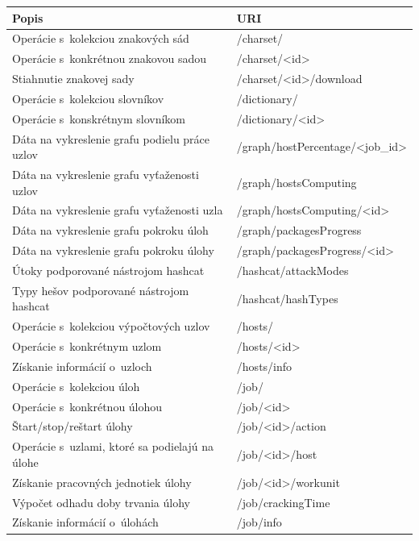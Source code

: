 \documentclass[zadani,slovak]{fitthesis}
\begin{document}
\begin{table}[h]
  \begin{center}
        \begin{tabular}{ |p{8cm}|p{7.4cm}|  }
         \hline
         Popis& URI\\
         \hline
          Operácie s~kolekciou znakových sád & /charset/ \\
          Operácie s~konkrétnou znakovou sadou & /charset/<id> \\
          Stiahnutie znakovej sady & /charset/<id>/download \\
          Operácie s~kolekciou slovníkov & /dictionary/ \\
          Operácie s~konskrétnym slovníkom & /dictionary/<id> \\
          Dáta na vykreslenie grafu podielu práce uzlov & /graph/hostPercentage/<job\_id> \\
          Dáta na vykreslenie grafu vyťaženosti uzlov & /graph/hostsComputing \\
          Dáta na vykreslenie grafu vyťaženosti uzla & /graph/hostsComputing/<id> \\
          Dáta na vykreslenie grafu pokroku úloh & /graph/packagesProgress \\
          Dáta na vykreslenie grafu pokroku úlohy & /graph/packagesProgress/<id> \\
          Útoky podporované nástrojom hashcat & /hashcat/attackModes \\
          Typy hešov podporované nástrojom hashcat & /hashcat/hashTypes \\
          Operácie s~kolekciou výpočtových uzlov & /hosts/ \\
          Operácie s~konkrétnym uzlom & /hosts/<id> \\
          Získanie informácií o~uzloch & /hosts/info \\
          Operácie s~kolekciou úloh & /job/ \\
          Operácie s~konkrétnou úlohou & /job/<id> \\
          Štart/stop/reštart úlohy & /job/<id>/action \\
          Operácie s~uzlami, ktoré sa podielajú na úlohe & /job/<id>/host \\
          Získanie pracovných jednotiek úlohy & /job/<id>/workunit \\
          Výpočet odhadu doby trvania úlohy & /job/crackingTime \\
          Získanie informácií o~úlohách & /job/info \\

\end{tabular}
\end{center}
\end{table}
\end{document}
